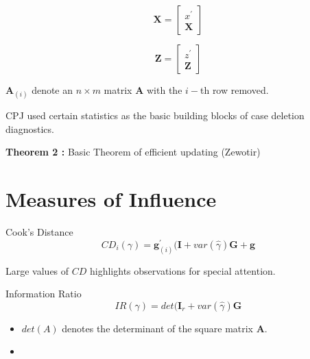 \documentclass[12pt, a4paper]{article}
\begin{document}
\[  \boldsymbol{X} = \left[  \begin{array}{c} x^{\prime} \\ \boldsymbol{X} \end{array} \right]   \]

\[  \boldsymbol{Z} = \left[  \begin{array}{c} z^{\prime} \\ \boldsymbol{Z} \end{array} \right]   \] 

$\boldsymbol{A}_{(i)}$ denote an $n\times m$ matrix $\boldsymbol{A}$ with the $i-$th row removed.


CPJ used certain statistics as the basic building blocks of case deletion diagnostics.



\textbf{Theorem 2 :} Basic Theorem of efficient updating (Zewotir)

\section{Measures of Influence}

Cook's Distance
\[  CD_{i}(\gamma) = \boldsymbol{g}^{\prime}_{(i)} ( \boldsymbol{I} + var(\hat{\gamma}) \boldsymbol{G} + \boldsymbol{g}\]

Large values of $CD$ highlights observations for special attention.

Information Ratio
\[ IR(\gamma) = det( \boldsymbol{I}_r + var(\hat{\gamma})\boldsymbol{G} \]

\begin{itemize}
\item $det(A)$ denotes the determinant of the square matrix $\boldsymbol{A}$.
\item
\end{itemize}
\end{document}
